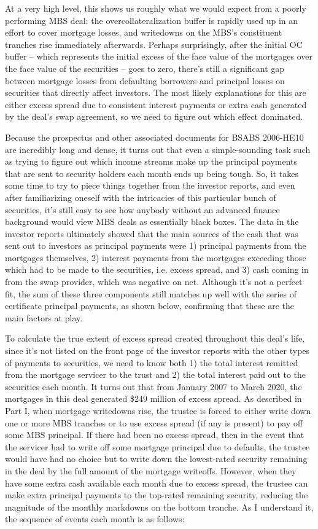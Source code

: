 \documentclass[12pt]{article}
\begin{document}
At a very high level, this shows us roughly what we would expect from a poorly performing MBS deal: the overcollateralization buffer is rapidly used up in an effort to cover mortgage losses, and writedowns on the MBS’s constituent tranches rise immediately afterwards. Perhaps surprisingly, after the initial OC buffer – which represents the initial excess of the face value of the mortgages over the face value of the securities – goes to zero, there’s still a significant gap between mortgage losses from defaulting borrowers and principal losses on securities that directly affect investors. The most likely explanations for this are either excess spread due to consistent interest payments or extra cash generated by the deal’s swap agreement, so we need to figure out which effect dominated.

	Because the prospectus and other associated documents for BSABS 2006-HE10 are incredibly long and dense, it turns out that even a simple-sounding task such as trying to figure out which income streams make up the principal payments that are sent to security holders each month ends up being tough. So, it takes some time to try to piece things together from the investor reports, and even after familiarizing oneself with the intricacies of this particular bunch of securities, it’s still easy to see how anybody without an advanced finance background would view MBS deals as essentially black boxes. The data in the investor reports ultimately showed that the main sources of the cash that was sent out to investors as principal payments were 1) principal payments from the mortgages themselves, 2) interest payments from the mortgages exceeding those which had to be made to the securities, i.e. excess spread, and 3) cash coming in from the swap provider, which was negative on net. Although it’s not a perfect fit, the sum of these three components still matches up well with the series of certificate principal payments, as shown below, confirming that these are the main factors at play.

To calculate the true extent of excess spread created throughout this deal’s life, since it’s not listed on the front page of the investor reports with the other types of payments to securities, we need to know both 1) the total interest remitted from the mortgage servicer to the trust and 2) the total interest paid out to the securities each month. It turns out that from January 2007 to March 2020, the mortgages in this deal generated \$249 million of excess spread. As described in Part I, when mortgage writedowns rise, the trustee is forced to either write down one or more MBS tranches or to use excess spread (if any is present) to pay off some MBS principal. If there had been no excess spread, then in the event that the servicer had to write off some mortgage principal due to defaults, the trustee would have had no choice but to write down the lowest-rated security remaining in the deal by the full amount of the mortgage writeoffs. However, when they have some extra cash available each month due to excess spread, the trustee can make extra principal payments to the top-rated remaining security, reducing the magnitude of the monthly markdowns on the bottom tranche. As I understand it, the sequence of events each month is as follows: 
\end{document}

